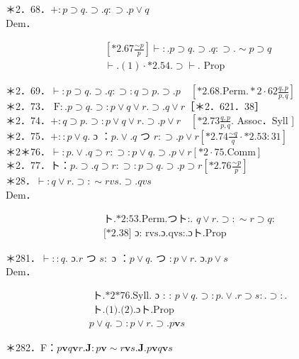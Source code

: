 \documentclass[10pt]{article}
\begin{document}
＊2．68．$+: p \supset q . \supset . q: \supset . p \vee q$\\
Dem．


\begin{align*}
& {\left[* 2.67 \frac{\sim p}{p}\right] \vdash: . p \supset q . \supset . q: \supset . \sim p \supset q}  \tag{1}\\
& \vdash .(1) \cdot * 2.54 . \supset \vdash . \text { Prop }
\end{align*}


＊2．69．$\vdash: p \supset q . \supset . q: \supset: q \supset p . \supset . p \quad\left[* 2.68 . \mathrm{Perm} . * 2 \cdot 62 \frac{q, p}{p, q}\right]$\\
＊2．73． $\mathrm{F}: . p \supset q . \supset: p \vee q \vee r . \supset . q \vee r$［＊2．621．38］\\
＊2．74．$+: q \supset p . \supset: p \vee q \vee r . \supset . p \vee r \quad\left[* 2.73 \frac{q, p}{p, q}\right.$. Assoc．Syll $]$\\
＊2．75．$+:: p \vee q$. ɔ ：$p . \vee . q$ つ $r: \supset . p \vee r\left[* 2.74 \frac{\sim q}{q} \cdot * 2.53: 31\right]$\\
＊2＊76．$\vdash: p . \vee . q \supset r: \supset: p \vee q . \supset . p \vee r[* 2 \cdot 75 . \mathrm{Comm}]$\\
＊2．77．ト：$p . \supset . q \supset r: \supset: p \supset q . \supset . p \supset r\left[* 2.76 \frac{\sim p}{p}\right]$\\
＊28．$\vdash: q \vee r . \supset: \sim r v s . \supset . q v s$\\
Dem．

$$
\begin{aligned}
& \text { ト.*2:53.Perm.つト:. } q \vee r . \supset: \sim r \supset q: \\
& \text { [*2.38] ɔ:~rvs.ɔ.qvs:.ɔト.Prop }
\end{aligned}
$$

＊281．$\vdash:: q$. ɔ.$r$ つ $s:$ ɔ ：$p \vee q$. つ $: p \vee r$. ɔ.$p \vee s$\\
Dem．


\begin{align*}
& \text { ト.*2*76.Syll. ɔ : : } p \vee q . \supset: p . \vee . r \supset s: . \supset: .  \tag{1}\\
& \text { ト.(1).(2).ɔト.Prop } \\
& p \vee q . \supset: p \vee r . \supset . p \mathbf{v} s \tag{2}
\end{align*}


＊282．F：$p \mathbf{v} q \mathbf{v} r . \boldsymbol{J}: p \mathbf{v} \sim r \mathbf{v} s . \boldsymbol{J} . p \mathbf{v} q \mathbf{v} s$
\end{document}
